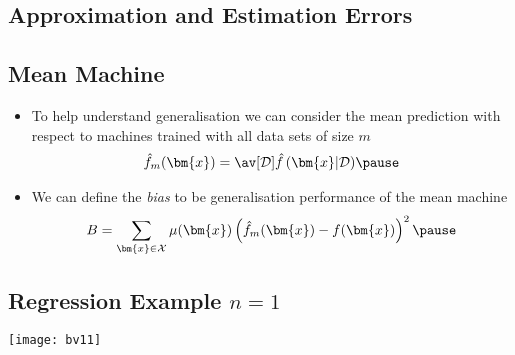 
\begin{slide}
\section[-2]{Approximation and Estimation Errors}
\pb\pause{}
\begin{center}
  \pause
\end{center}

\end{slide}


\begin{slide}
\section{Mean Machine}

\begin{PauseHighLight}
  \begin{itemize}
  \item To help understand generalisation we can consider the mean
    prediction with respect to machines trained with all data sets of
    size $m$
    \begin{align*}
      \hat{f}_m(\bm{x}) = \av[\mathcal{D}]{ \hat{f}\left(\bm{x} |
      \mathcal{D}\right)} \pause
    \end{align*}
  \item We can define the \emph{bias} to be generalisation performance
    of the mean machine
    \begin{align*}
      B = \sum_{\bm{x}\in\mathcal{X}} \mu(\bm{x}) \left( \hat{f}_m(\bm{x})
      - f(\bm{x}) \right)^2\pause
    \end{align*}
  \end{itemize}
\end{PauseHighLight}

\end{slide}



\whitepage
\begin{slide}
\section[-1]{Regression Example $n=1$}

\pb\pause{}
\begin{center}
  \texttt{[image: bv11]}\pause
  \llap{\texttt{[image: bv12]}}\pause
  \llap{\texttt{[image: bv13]}}\pause
  \llap{\texttt{[image: bv14]}}\pause
\end{center}

\end{slide}



